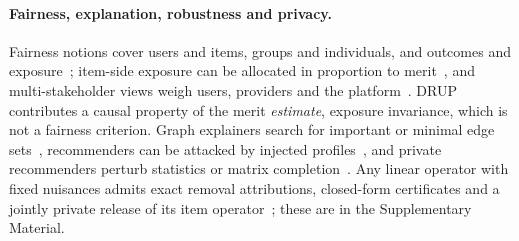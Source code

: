 \paragraph{Fairness, explanation, robustness and privacy.}
Fairness notions cover users and items, groups and individuals, and outcomes and
exposure~\citep{wang2023fairness,amigo2023fairness}; item-side exposure can be
allocated in proportion to merit~\citep{singh2018exposure,diaz2020expected}, and
multi-stakeholder views weigh users, providers and the
platform~\citep{abdollahpouri2020multistakeholder,ekstrand2022fairness}. DRUP
contributes a causal property of the merit \emph{estimate}, exposure invariance,
which is not a fairness criterion. Graph explainers search for important or
minimal edge sets~\citep{ying2019gnnexplainer,lucic2022cfgnn,ghazimatin2020prince},
recommenders can be attacked by injected
profiles~\citep{lam2004shilling,li2016poisoning,fang2018poisoning}, and private
recommenders perturb statistics or matrix
completion~\citep{mcsherry2009netflix,jain2018dpmc}. Any linear operator with fixed
nuisances admits exact removal attributions, closed-form certificates and a jointly
private release of its item operator~\citep{balle2018analytic,hsu2014matchings};
these are in the Supplementary Material.

